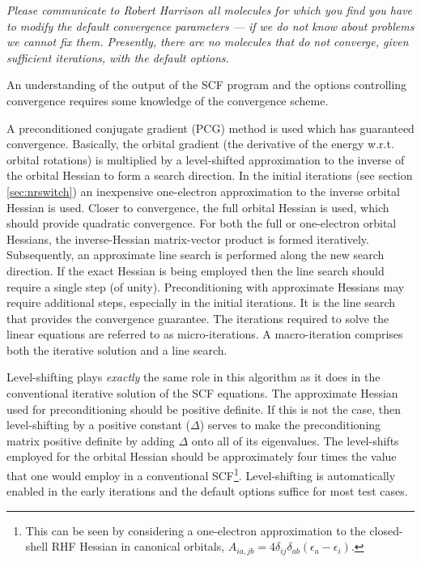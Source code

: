 {\em Please communicate to Robert Harrison all molecules for which you
  find you have to modify the default convergence parameters --- if we
  do not know about problems we cannot fix them.  Presently, there are
  no molecules that do not converge, given sufficient iterations, with
  the default options.}

An understanding of the output of the SCF program and the options
controlling convergence requires some knowledge of the convergence
scheme.

A preconditioned conjugate gradient (PCG) method is used which has
guaranteed convergence.  Basically, the orbital gradient (the
derivative of the energy w.r.t. orbital rotations) is multiplied by a
level-shifted approximation to the inverse of the orbital Hessian to
form a search direction.  In the initial iterations (see section
\ref{sec:nrswitch}) an inexpensive one-electron approximation to the
inverse orbital Hessian is used.  Closer to convergence, the full
orbital Hessian is used, which should provide quadratic convergence.
For both the full or one-electron orbital Hessians, the
inverse-Hessian matrix-vector product is formed iteratively.
Subsequently, an approximate line search is performed along the new
search direction.  If the exact Hessian is being employed then the
line search should require a single step (of unity).  Preconditioning
with approximate Hessians may require additional steps, especially in
the initial iterations.  It is the line search that provides the
convergence guarantee.  The iterations required to solve the linear
equations are referred to as micro-iterations.  A macro-iteration
comprises both the iterative solution and a line search.

  Level-shifting plays {\em exactly} the same role in this algorithm
as it does in the conventional iterative solution of the SCF
equations.  The approximate Hessian used for preconditioning should be
positive definite.  If this is not the case, then level-shifting by a
positive constant ($\Delta$) serves to make the preconditioning matrix
positive definite by adding $\Delta$ onto all of its eigenvalues.  The
level-shifts employed for the orbital Hessian should be approximately
four times the value that one would employ in a conventional
SCF\footnote{This can be seen by considering a one-electron
approximation to the closed-shell RHF Hessian in canonical orbitals,
$A_{ia,jb} = 4 \delta_{ij} \delta_{ab} (\epsilon_a - \epsilon_i)$.}.
Level-shifting is automatically enabled in the early iterations and
the default options suffice for most test cases.


